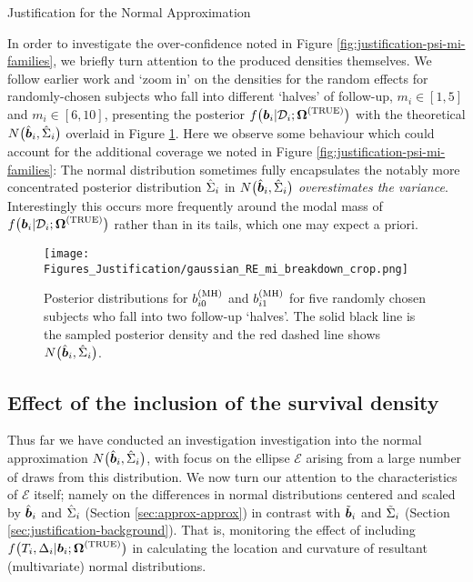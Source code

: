 \begin{chapter}{\label{cha:justification}Justification for the Normal Approximation}

  In order to investigate the over-confidence noted in Figure \ref{fig:justification-psi-mi-families}, we briefly turn attention to the produced densities themselves. We follow earlier work \citep{Murray2023} and `zoom in' on the densities for the random effects for randomly-chosen subjects who fall into different `halves' of follow-up, $m_i\in[1,5]$ and $m_i\in[6,10]$, presenting the posterior $f\big(\bm{b}_i|\mathcal{D}_i;\bm{\mathrm{\Omega}}^{(\mathrm{TRUE})}\big)$ with the theoretical $N\big(\hat{\bm{b}}_i,\hat{\Sigma}_i\big)$ overlaid in Figure \ref{fig:justification-gaussian-breakdown}. Here we observe some behaviour which could account for the additional coverage we noted in Figure \ref{fig:justification-psi-mi-families}: The normal distribution sometimes fully encapsulates the notably more concentrated posterior distribution \ie $\hat{\Sigma}_i$ in $N\big(\hat{\bm{b}}_i,\hat{\Sigma}_i\big)$ \textit{overestimates the variance}. Interestingly this occurs more frequently around the modal mass of $f\big(\bm{b}_i|\mathcal{D}_i;\bm{\mathrm{\Omega}}^{(\mathrm{TRUE})}\big)$ rather than in its tails, which one may expect a priori.

  \begin{figure}[ht]
      \centering
      \texttt{[image: Figures\_Justification/gaussian\_RE\_mi\_breakdown\_crop.png]}
      \caption{Posterior distributions for $b_{i0}^{(\mathrm{MH})}$ and $b_{i1}^{(\mathrm{MH})}$ for five randomly chosen subjects who fall into two follow-up `halves'. The solid black line is the sampled posterior density and the red dashed line shows $N\big(\hat{\bm{b}}_i,\hat{\Sigma}_i\big)$.}
      \label{fig:justification-gaussian-breakdown}
  \end{figure}

  \subsection{Effect of the inclusion of the survival density}\label{sec:justification-include-surv-ellipse}
  Thus far we have conducted an investigation investigation into the normal approximation $N\big(\hat{\bm{b}}_i,\hat{\Sigma}_i\big)$, with focus on the ellipse $\mathcal{E}$ arising from a large number of draws from this distribution. We now turn our attention to the characteristics of $\mathcal{E}$ itself; namely on the differences in normal distributions centered and scaled by $\hat{\bm{b}}_i$ and $\hat{\Sigma}_i$ (\ie Section \ref{sec:approx-approx}) in contrast with $\tilde{\bm{b}}_i$ and $\tilde{\Sigma}_i$ (Section \ref{sec:justification-background}). That is, monitoring the effect of including $f\big(T_i,\Delta_i|\bm{b}_i;\bm{\mathrm{\Omega}}^{(\mathrm{TRUE})}\big)$ in calculating the location and curvature of resultant (multivariate) normal distributions.
  

\end{chapter}
